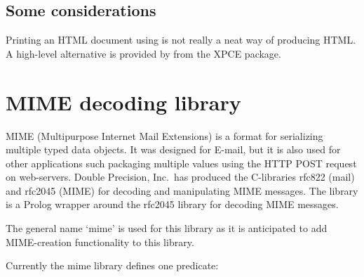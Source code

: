 \documentclass[11pt]{article}
\begin{document}
\noindent
\subsection{Some considerations}

Printing an HTML document using  is not really a neat way
of producing HTML.  A high-level alternative is provided by
 from the XPCE package.


\section{MIME decoding library}

MIME (Multipurpose Internet Mail Extensions) is a format for serializing
multiple typed data objects.  It was designed for E-mail, but it is also
used for other applications such packaging multiple values using the
HTTP POST request on web-servers.  Double Precision, Inc.\ has produced
the C-libraries rfc822 (mail) and rfc2045 (MIME) for decoding and
manipulating MIME messages. The  library is a Prolog wrapper
around the rfc2045 library for decoding MIME messages.	

The general name `mime' is used for this library as it is anticipated to
add MIME-creation functionality to this library.

Currently the mime library defines one predicate:
\end{document}
